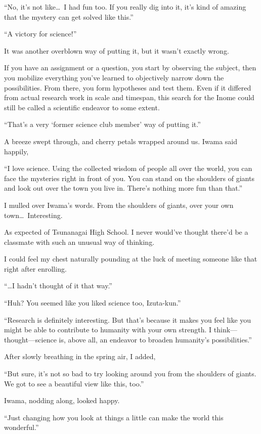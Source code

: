 \documentclass[
    a4paper,
    12pt,
    twoside,
    openany,
    UTF8,
    fontset=windows
]{ctexbook}
\begin{document}
``No, it's not like\dots\ I had fun too. If you really dig into it, it's kind of amazing that the mystery can get solved like this.''

``A victory for science!''

It was another overblown way of putting it, but it wasn't exactly wrong.

If you have an assignment or a question, you start by observing the subject, then you mobilize everything you've learned to objectively narrow down the possibilities. From there, you form hypotheses and test them. Even if it differed from actual research work in scale and timespan, this search for the Inome could still be called a scientific endeavor to some extent.

``That's a very `former science club member' way of putting it.''

A breeze swept through, and cherry petals wrapped around us. Iwama said happily,

``I love science. Using the collected wisdom of people all over the world, you can face the mysteries right in front of you. You can stand on the shoulders of giants and look out over the town you live in. There's nothing more fun than that.''

I mulled over Iwama's words. From the shoulders of giants, over your own town\dots\ Interesting.

As expected of Tsunanagai High School. I never would've thought there'd be a classmate with such an unusual way of thinking.

I could feel my chest naturally pounding at the luck of meeting someone like that right after enrolling.

``\dots I hadn't thought of it that way.''

``Huh? You seemed like you liked science too, Izuta-kun.''

``Research is definitely interesting. But that's because it makes you feel like you might be able to contribute to humanity with your own strength. I think---thought---science is, above all, an endeavor to broaden humanity's possibilities.''

After slowly breathing in the spring air, I added,

``But sure, it's not so bad to try looking around you from the shoulders of giants. We got to see a beautiful view like this, too.''

Iwama, nodding along, looked happy.

``Just changing how you look at things a little can make the world this wonderful.''
\end{document}
